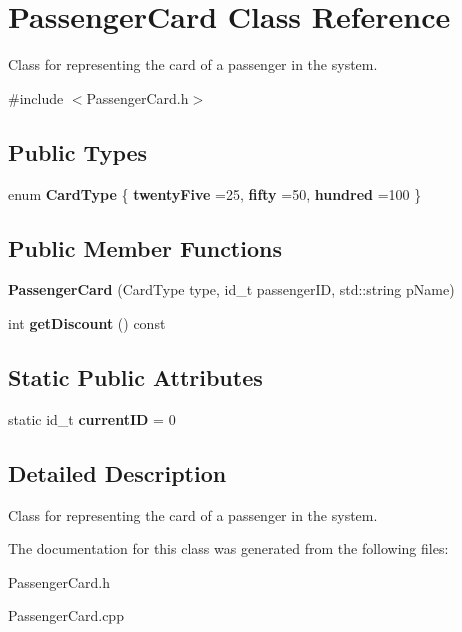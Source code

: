 \hypertarget{classPassengerCard}{}\section{Passenger\+Card Class Reference}
\label{classPassengerCard}


Class for representing the card of a passenger in the system.  




{\ttfamily \#include $<$Passenger\+Card.\+h$>$}

\subsection*{Public Types}
\begin{DoxyCompactItemize}
\item 
\mbox{\label{classPassengerCard_ac30388c823af514403463a797e2878af}} 
enum {\bfseries Card\+Type} \{ {\bfseries twenty\+Five} =25, 
{\bfseries fifty} =50, 
{\bfseries hundred} =100
 \}
\end{DoxyCompactItemize}
\subsection*{Public Member Functions}
\begin{DoxyCompactItemize}
\item 
\mbox{\label{classPassengerCard_a1ebc730da7c0820350024f29c37ce9d9}} 
{\bfseries Passenger\+Card} (Card\+Type type, id\+\_\+t passenger\+ID, std\+::string p\+Name)
\item 
\mbox{\label{classPassengerCard_a62d2651d233d28643d5e0863500c42c4}} 
int {\bfseries get\+Discount} () const
\end{DoxyCompactItemize}
\subsection*{Static Public Attributes}
\begin{DoxyCompactItemize}
\item 
\mbox{\label{classPassengerCard_af557a01fde14b95c0e0b355e777e2aec}} 
static id\+\_\+t {\bfseries current\+ID} = 0
\end{DoxyCompactItemize}


\subsection{Detailed Description}
Class for representing the card of a passenger in the system. 

The documentation for this class was generated from the following files\+:\begin{DoxyCompactItemize}
\item 
Passenger\+Card.\+h\item 
Passenger\+Card.\+cpp\end{DoxyCompactItemize}

